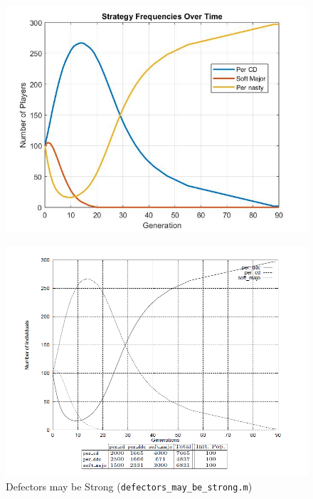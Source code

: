 \begin{figure}[htbp]
\vspace*{1em}
  \centering
  \begin{minipage}{0.48\textwidth}
    \centering
 \includegraphics[width=0.8\linewidth]{fit_plots_theoretical/defectors_may_be_strong}

\label{fig:defectorsmaybestrong}
  \end{minipage}
  \hfill
  \begin{minipage}{0.48\textwidth}
    \centering
  \includegraphics[width=0.8\linewidth]{defectors_may_be_strong }

  \end{minipage}
  \caption{Defectors may be Strong (\texttt{defectors\_may\_be\_strong.m})}
\end{figure}

